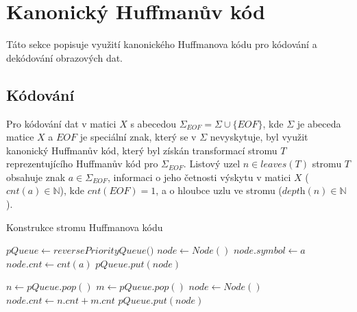 \documentclass[a4paper, 11pt, fleqn]{scrartcl}
\begin{document}
    \section{Kanonický Huffmanův kód}
      Táto sekce popisuje využití kanonického Huffmanova kódu pro kódování a dekódování obrazových dat.

      \subsection{Kódování}
        Pro kódování dat v matici $X$ s abecedou $\Sigma_{EOF} = \Sigma \cup \{\textit{EOF}\}$, kde $\Sigma$ je abeceda matice $X$ a $\textit{EOF}$ je speciální znak, který se v $\Sigma$ nevyskytuje, byl využit kanonický Huffmanův kód, který byl získán transformací stromu $T$ reprezentujícího Huffmanův kód pro $\Sigma_{EOF}$. Listový uzel $n \in leaves(T)$ stromu $T$ obsahuje znak $a \in \Sigma_{EOF}$, informaci o jeho četnosti výskytu v matici $X$ ($cnt(a) \in \mathbb{N}$), kde $cnt(\textit{EOF}) = 1$, a o hloubce uzlu ve stromu ($\textit{depth}(n) \in \mathbb{N}$).

        \begin{algorithm}[!h]
          \SetAlgoLined
          \DontPrintSemicolon
          \caption{Konstrukce stromu Huffmanova kódu}

          \vspace*{2mm}

          $pQueue \leftarrow \textit{reversePriorityQueue()}$ 
          {
            $node \leftarrow Node()$
            $node.symbol \leftarrow a$\;
            $node.cnt \leftarrow cnt(a)$\;
            $pQueue.put(node)$\;
          }

          \vspace*{1mm}

          {
            $n \leftarrow pQueue.pop()$\;
            $m \leftarrow pQueue.pop()$\;
            $node \leftarrow Node()$
            $node.cnt \leftarrow n.cnt + m.cnt$\;
            $pQueue.put(node)$\;
          }


        \end{algorithm}

        \newpage
\end{document}
